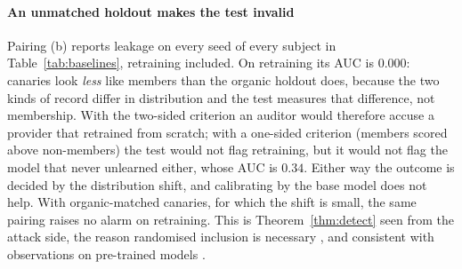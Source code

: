 \begin{table}[t]
\centering\footnotesize\setlength{\tabcolsep}{3.5pt}
\caption{Fraction of seeds (VOUCH: of seeds $\times$ $40$ reveal orders) in which each audit
reports leakage, literal-only semantic design, Pythia-410M, eight seeds. VOUCH columns are
REVOKED rates of the literal and the union rule; ``sign'' is the paired fixed-sample sign
test; membership-inference columns are fractions of seeds whose $95\%$ bootstrap AUC
interval excludes $0.5$, two-sided. Retraining satisfies the exact null, so every positive entry in
its row is a false alarm. Subjects are a subset of the grid; all are in the released results.}
\label{tab:baselines}

\end{table}

\paragraph{An unmatched holdout makes the test invalid} Pairing (b) reports leakage on every
seed of every subject in Table~\ref{tab:baselines}, retraining included. On retraining its AUC
is $0.000$: canaries look \emph{less} like members than the organic holdout does, because the
two kinds of record differ in distribution and the test measures that difference, not
membership. With the two-sided criterion an auditor would therefore accuse a provider that
retrained from scratch; with a one-sided criterion (members scored above non-members) the test
would not flag retraining, but it would not flag the model that never unlearned either, whose
AUC is $0.34$. Either way the outcome is decided by the distribution shift, and calibrating by
the base model does not help. With organic-matched canaries, for which the shift is small, the
same pairing raises no alarm on retraining. This is Theorem~\ref{thm:detect} seen from the
attack side, the reason randomised inclusion is necessary \citep{zhang2024mia}, and consistent
with observations on pre-trained models \citep{duan2024membership,das2024blind}.

